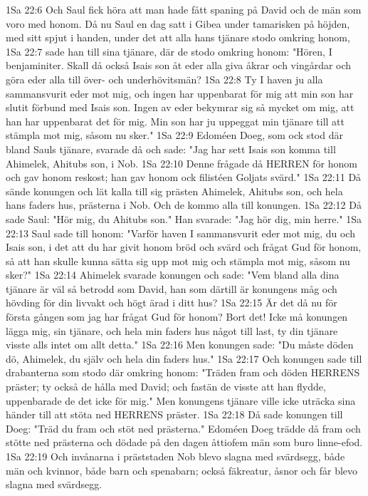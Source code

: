 1Sa 22:6  Och Saul fick höra att man hade fått spaning på David och de män som voro med honom. Då nu Saul en dag satt i Gibea under tamarisken på höjden, med sitt spjut i handen, under det att alla hans tjänare stodo omkring honom,
1Sa 22:7  sade han till sina tjänare, där de stodo omkring honom: "Hören, I benjaminiter. Skall då också Isais son åt eder alla giva åkrar och vingårdar och göra eder alla till över- och underhövitsmän?
1Sa 22:8  Ty I haven ju alla sammansvurit eder mot mig, och ingen har uppenbarat för mig att min son har slutit förbund med Isais son. Ingen av eder bekymrar sig så mycket om mig, att han har uppenbarat det för mig. Min son har ju uppeggat min tjänare till att stämpla mot mig, såsom nu sker."
1Sa 22:9  Edoméen Doeg, som ock stod där bland Sauls tjänare, svarade då och sade: "Jag har sett Isais son komma till Ahimelek, Ahitubs son, i Nob.
1Sa 22:10  Denne frågade då HERREN för honom och gav honom reskost; han gav honom ock filistéen Goljats svärd."
1Sa 22:11  Då sände konungen och lät kalla till sig prästen Ahimelek, Ahitubs son, och hela hans faders hus, prästerna i Nob. Och de kommo alla till konungen.
1Sa 22:12  Då sade Saul: "Hör mig, du Ahitubs son." Han svarade: "Jag hör dig, min herre."
1Sa 22:13  Saul sade till honom: "Varför haven I sammansvurit eder mot mig, du och Isais son, i det att du har givit honom bröd och svärd och frågat Gud för honom, så att han skulle kunna sätta sig upp mot mig och stämpla mot mig, såsom nu sker?"
1Sa 22:14  Ahimelek svarade konungen och sade: "Vem bland alla dina tjänare är väl så betrodd som David, han som därtill är konungens måg och hövding för din livvakt och högt ärad i ditt hus?
1Sa 22:15  Är det då nu för första gången som jag har frågat Gud för honom? Bort det! Icke må konungen lägga mig, sin tjänare, och hela min faders hus något till last, ty din tjänare visste alls intet om allt detta."
1Sa 22:16  Men konungen sade: "Du måste döden dö, Ahimelek, du själv och hela din faders hus."
1Sa 22:17  Och konungen sade till drabanterna som stodo där omkring honom: "Träden fram och döden HERRENS präster; ty också de hålla med David; och fastän de visste att han flydde, uppenbarade de det icke för mig." Men konungens tjänare ville icke uträcka sina händer till att stöta ned HERRENS präster.
1Sa 22:18  Då sade konungen till Doeg: "Träd du fram och stöt ned prästerna." Edoméen Doeg trädde då fram och stötte ned prästerna och dödade på den dagen åttiofem män som buro linne-efod.
1Sa 22:19  Och invånarna i präststaden Nob blevo slagna med svärdsegg, både män och kvinnor, både barn och spenabarn; också fäkreatur, åsnor och får blevo slagna med svärdsegg.
